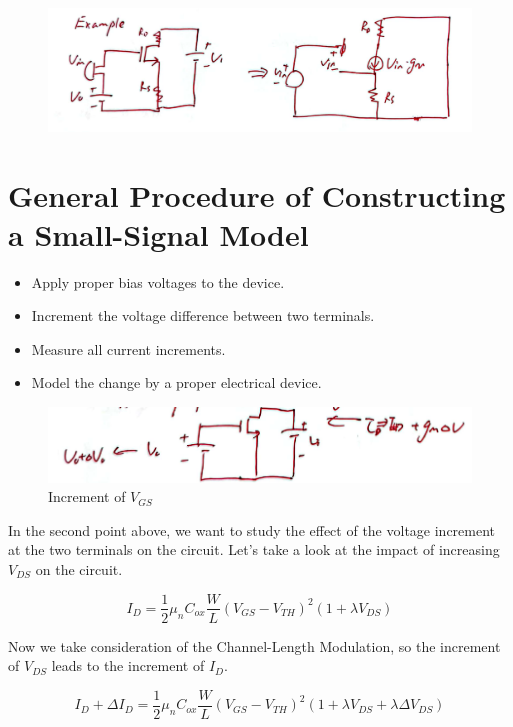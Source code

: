 \documentclass[fontset=windows]{article}
\begin{document}
\begin{figure}[htbp]
    \centering
    \includegraphics[scale=0.6]{3.jpg}
    \captionsetup{labelformat=empty}
    \caption{}
    \label{3}
\end{figure}

\section*{General Procedure of Constructing a Small-Signal Model}

\begin{itemize}
	\item Apply proper bias voltages to the device. 
	\item Increment the voltage difference between two terminals. 
	\item Measure all current increments. 
	\item Model the change by a proper electrical device. 
\end{itemize}

\begin{figure}[htbp]
    \centering
    \includegraphics[scale=0.6]{4.jpg}
    \captionsetup{labelformat=empty}
    \caption{Increment of $V_{GS}$}
    \label{4}
\end{figure}

In the second point above, we want to study the effect of the voltage increment at the two terminals on the circuit. 
Let's take a look at the impact of increasing $V_{DS}$ on the circuit. 

$$I_D=\frac{1}{2} \mu_n C_{ox}\frac{W}{L}(V_{GS}-V_{TH})^2(1+\lambda V_{DS})$$

Now we take consideration of the Channel-Length Modulation, so the increment of $V_{DS}$ leads to the increment of $I_D$. 

$$I_D+\Delta I_D=\frac{1}{2} \mu_n C_{ox}\frac{W}{L}(V_{GS}-V_{TH})^2(1+\lambda V_{DS}+\lambda \Delta V_{DS})$$
\end{document}
